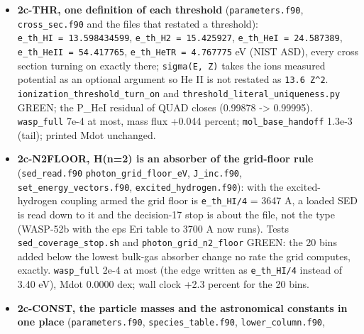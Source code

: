 \documentclass[english,a4paper]{my_memo}
\begin{document}
\begin{itemize}
  as two sub-steps: the helium mass alone moves \texttt{wasp\_full} by 2.3e-3 in T,
  1.1e-2 in x(H+), Mdot +0.095 percent, and \texttt{mol\_base\_handoff} by 1.2e-2
  (tail), Mdot -0.004 percent; the Jupiter radius then rescales every
  physical length (R0, the domain top \texttt{r\_max} in R\_p units, the gravity)
  and moves \texttt{wasp\_full} by 7.3e-2 in T, 0.16 in n\_e, 0.34 in x(H+), raw
  Mdot +11.0 percent (printed 13.24 -\textgreater{} 13.29), and \texttt{mol\_base\_handoff} raw
  Mdot +15.8 percent (printed 10.52 -\textgreater{} 10.58). MASS2 alone (the remaining
  copies): \texttt{mol\_diffusion} 2.8e-5, \texttt{mol\_carrier} 6.5e-8, \texttt{wasp\_full}
  byte-identical.
\item
  \textbf{2c-THR, one definition of each threshold} (\texttt{parameters.f90},
  \texttt{cross\_sec.f90} and the files that restated a threshold): \texttt{e\_th\_HI\ =\ 13.598434599}, \texttt{e\_th\_H2\ =\ 15.425927}, \texttt{e\_th\_HeI\ =\ 24.587389}, \texttt{e\_th\_HeII\ =\ 54.417765}, \texttt{e\_th\_HeTR\ =\ 4.767775} eV (NIST ASD), every cross section
  turning on exactly there; \texttt{sigma(E,\ Z)} takes the ion\textquotesingle s measured potential
  as an optional argument so He II is not restated as \texttt{13.6\ Z\^{}2}.
  \texttt{ionization\_threshold\_turn\_on} and \texttt{threshold\_literal\_uniqueness.py}
  GREEN; the P\_HeI residual of QUAD closes (0.99878 -\textgreater{} 0.99995).
  \texttt{wasp\_full} 7e-4 at most, mass flux +0.044 percent; \texttt{mol\_base\_handoff}
  1.3e-3 (tail); printed Mdot unchanged.
\item
  \textbf{2c-N2FLOOR, H(n=2) is an absorber of the grid-floor rule} (\texttt{sed\_read.f90}
  \texttt{photon\_grid\_floor\_eV}, \texttt{J\_inc.f90}, \texttt{set\_energy\_vectors.f90},
  \texttt{excited\_hydrogen.f90}): with the excited-hydrogen coupling armed the grid
  floor is \texttt{e\_th\_HI/4} = 3647 A, a loaded SED is read down to it and the
  decision-17 stop is about the file, not the type (WASP-52b with the eps Eri
  table to 3700 A now runs). Tests \texttt{sed\_coverage\_stop.sh} and
  \texttt{photon\_grid\_n2\_floor} GREEN: the 20 bins added below the lowest bulk-gas
  absorber change no rate the grid computes, exactly. \texttt{wasp\_full} 2e-4 at
  most (the edge written as \texttt{e\_th\_HI/4} instead of 3.40 eV), Mdot 0.0000
  dex; wall clock +2.3 percent for the 20 bins.
\item
  \textbf{2c-CONST, the particle masses and the astronomical constants in one
  place} (\texttt{parameters.f90}, \texttt{species\_table.f90}, \texttt{lower\_column.f90},

\end{itemize}
\end{document}
